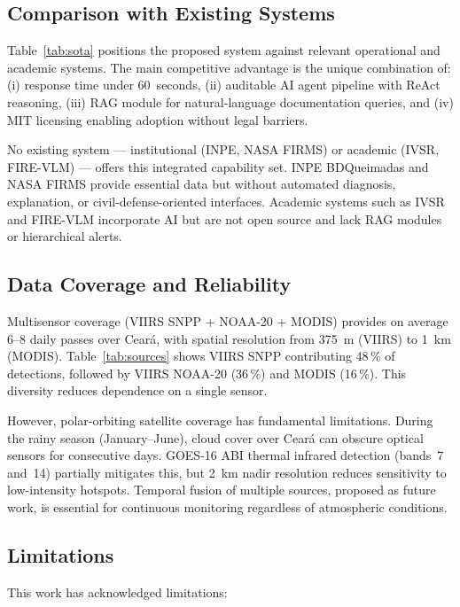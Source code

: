 \documentclass[preprint,times,numbers]{elsarticle}
\begin{document}
\subsection{Comparison with Existing Systems}

Table~\ref{tab:sota} positions the proposed system against relevant operational and academic systems. The main competitive advantage is the unique combination of: (i) response time under 60~seconds, (ii) auditable AI agent pipeline with ReAct reasoning, (iii) RAG module for natural-language documentation queries, and (iv) MIT licensing enabling adoption without legal barriers.

No existing system --- institutional (INPE, NASA FIRMS) or academic (IVSR, FIRE-VLM) --- offers this integrated capability set. INPE BDQueimadas and NASA FIRMS provide essential data but without automated diagnosis, explanation, or civil-defense-oriented interfaces. Academic systems such as IVSR \cite{article:morsali2026} and FIRE-VLM \cite{article:webb2026} incorporate AI but are not open source and lack RAG modules or hierarchical alerts.

\subsection{Data Coverage and Reliability}

Multisensor coverage (VIIRS SNPP + NOAA-20 + MODIS) provides on average 6--8 daily passes over Cear\'{a}, with spatial resolution from 375~m (VIIRS) to 1~km (MODIS). Table~\ref{tab:sources} shows VIIRS SNPP contributing 48\,\% of detections, followed by VIIRS NOAA-20 (36\,\%) and MODIS (16\,\%). This diversity reduces dependence on a single sensor.

However, polar-orbiting satellite coverage has fundamental limitations. During the rainy season (January--June), cloud cover over Cear\'{a} can obscure optical sensors for consecutive days. GOES-16 ABI thermal infrared detection (bands~7 and~14) partially mitigates this, but 2~km nadir resolution reduces sensitivity to low-intensity hotspots. Temporal fusion of multiple sources, proposed as future work, is essential for continuous monitoring regardless of atmospheric conditions.

\subsection{Limitations}

This work has acknowledged limitations:
\end{document}
